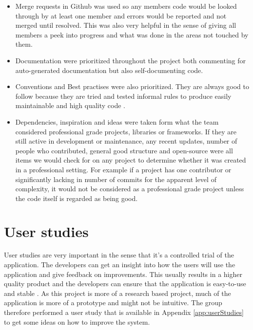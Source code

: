 \begin{itemize}
    \item Merge requests in Github was used so any members code would be looked through by at least one member and errors would be reported and not merged until resolved. This was also very helpful in the sense of giving all members a peek into progress and what was done in the areas not touched by them. 
    \item Documentation were prioritized throughout the project both commenting for auto-generated documentation but also self-documenting code.
    \item Conventions and Best practises were also prioritized. They are always good to follow because they are tried and tested informal rules to produce easily maintainable and high quality code \cite{wiki:bestCodingPractises}. 
    \item Dependencies, inspiration and ideas were taken form what the team considered professional grade projects, libraries or frameworks. If they are still active in development or maintenance, any recent updates, number of people who contributed, general good structure and open-source were all items we would check for on any project to determine whether it was created in a professional setting. For example if a project has one contributor or significantly lacking in number of commits for the apparent level of complexity, it would not be considered as a professional grade project unless the code itself is regarded as being good. %
\end{itemize}

\section{User studies}
User studies are very important in the sense that it's a controlled trial of the application. The developers can get an insight into how the users will use the application and give feedback on improvements. This usually results in a higher quality product and the developers can ensure that the application is easy-to-use and stable \cite{kosara2003user, sridhar1995understandingTheUser}. As this project is more of a research based project, much of the application is more of a prototype and might not be intuitive. The group therefore performed a user study that is available in Appendix \ref{app:userStudies} to get some ideas on how to improve the system. 

